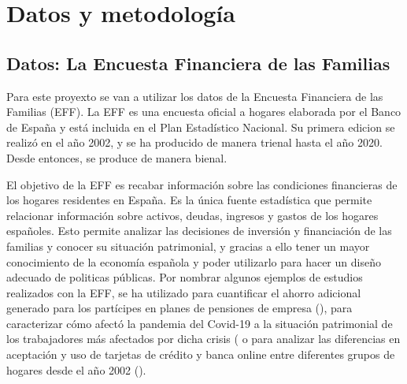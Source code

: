 \chapter{Datos y metodología}
\label{chapter:datos_metodologia}

\section{Datos: La Encuesta Financiera de las Familias}

Para este proyexto se van a utilizar los datos de la Encuesta Financiera de las Familias (EFF). La EFF es una encuesta oficial a hogares elaborada por el Banco de España y está incluida en el Plan Estadístico Nacional. Su primera edicion se realizó en el año 2002, y se ha producido de manera trienal hasta el año 2020. Desde entonces, se produce de manera bienal.

El objetivo de la EFF es recabar información sobre las condiciones financieras de los hogares residentes en España. Es la única fuente estadística que permite relacionar información sobre activos, deudas, ingresos y gastos de los hogares españoles. Esto permite analizar las decisiones de inversión y financiación de las familias y conocer su situación patrimonial, y gracias a ello tener un mayor conocimiento de la economía española y poder utilizarlo para hacer un diseño adecuado de politicas públicas. Por nombrar algunos ejemplos de estudios realizados con la EFF, se ha utilizado para cuantificar el ahorro adicional generado para los partícipes en planes de pensiones de empresa (\cite{gomez2022pensiones}), para caracterizar cómo afectó la pandemia del Covid-19 a la situación patrimonial de los trabajadores más afectados por dicha crisis (\cite{alvargonzalez2020pandemia} o para analizar las diferencias en aceptación y uso de tarjetas de crédito y banca online entre diferentes grupos de hogares desde el año 2002 (\cite{crespo2023bancaonline}).

